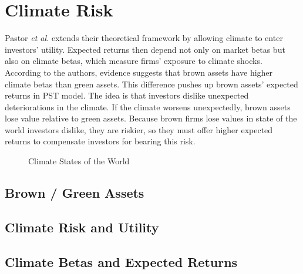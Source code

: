 \chapter{Climate Risk}

Pastor \textit{et al.} extends their theoretical framework
by allowing climate to enter investors' utility. 
Expected returns then depend not only on market betas 
but also on climate betas, which measure firms' exposure 
to climate shocks. According to the authors, 
evidence suggests that brown assets have 
higher climate betas than green assets.
This difference pushes up brown assets' expected returns in 
PST model. The idea is that investors dislike unexpected 
deteriorations in the climate. If the climate 
worsens unexpectedly, brown assets lose value relative 
to green assets. Because brown firms lose values in 
state of the world investors dislike, they are riskier, 
so they must offer higher expected returns to compensate
investors for bearing this risk.

\begin{figure}[htbp]
    \centering
    \caption{Climate States of the World}
    \label{fig:climate_risk}
\end{figure}


\section{Brown / Green Assets}

\section{Climate Risk and Utility}



\section{Climate Betas and Expected Returns}